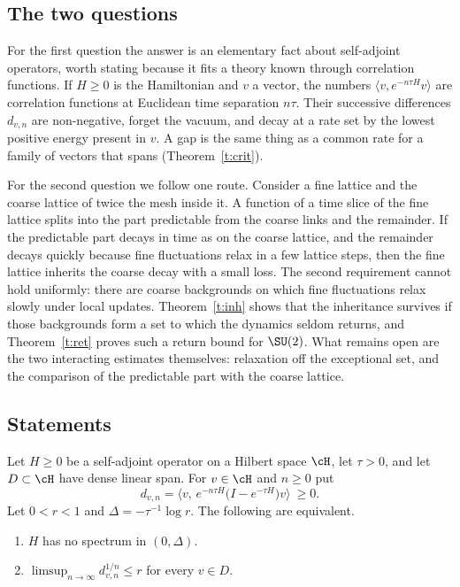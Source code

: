 \subsection{The two questions}
For the first question the answer is an elementary fact about self-adjoint operators, worth stating because
it fits a theory known through correlation functions. If $H\ge0$ is the Hamiltonian and $v$ a vector, the
numbers $\langle v,e^{-n\tau H}v\rangle$ are correlation functions at Euclidean time separation $n\tau$. Their
successive differences $d_{v,n}$ are non-negative, forget the vacuum, and decay at a rate set by the lowest
positive energy present in $v$. A gap is the same thing as a common rate for a family of vectors that spans
(Theorem~\ref{t:crit}).

For the second question we follow one route. Consider a fine lattice and the coarse lattice of twice the
mesh inside it. A function of a time slice of the fine lattice splits into the part predictable from the
coarse links and the remainder. If the predictable part decays in time as on the coarse lattice, and the
remainder decays quickly because fine fluctuations relax in a few lattice steps, then the fine lattice
inherits the coarse decay with a small loss. The second requirement cannot hold uniformly: there are coarse
backgrounds on which fine fluctuations relax slowly under local updates. Theorem~\ref{t:inh} shows that the
inheritance survives if those backgrounds form a set to which the dynamics seldom returns, and
Theorem~\ref{t:ret} proves such a return bound for $\SU(2)$. What remains open are the two interacting
estimates themselves: relaxation off the exceptional set, and the comparison of the predictable part with the
coarse lattice.

\subsection{Statements}
\begin{theorem}\label{t:crit}
Let $H\ge0$ be a self-adjoint operator on a Hilbert space $\cH$, let $\tau>0$, and let $D\subset\cH$ have dense
linear span. For $v\in\cH$ and $n\ge0$ put
\[
d_{v,n}=\big\langle v,\,e^{-n\tau H}\big(I-e^{-\tau H}\big)v\big\rangle\ \ge0 .
\]
Let $0<r<1$ and $\Delta=-\tau^{-1}\log r$. The following are equivalent.
\begin{enumerate}
\item $H$ has no spectrum in $(0,\Delta)$.
\item $\limsup_{n\to\infty}d_{v,n}^{1/n}\le r$ for every $v\in D$.
\end{enumerate}
\end{theorem}

